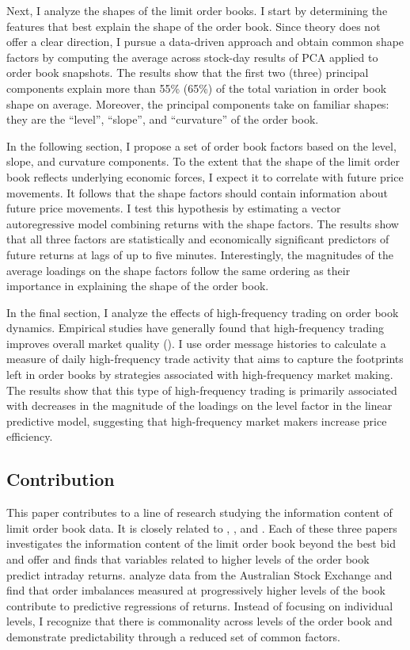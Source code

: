 Next, I analyze the shapes of the limit order books. I start by determining the features that best explain the shape of the order book. Since theory does not offer a clear direction, I pursue a data-driven approach and obtain common shape factors by computing the average across stock-day results of PCA applied to order book snapshots. The results show that the first two (three) principal components explain more than 55\% (65\%) of the total variation in order book shape on average. Moreover, the principal components take on familiar shapes: they are the ``level'', ``slope'', and ``curvature'' of the order book.

In the following section, I propose a set of order book factors based on the level, slope, and curvature components. To the extent that the shape of the limit order book reflects underlying economic forces, I expect it to correlate with future price movements. It follows that the shape factors should contain information about future price movements. I test this hypothesis by estimating a vector autoregressive model combining returns with the shape factors. The results show that all three factors are statistically and economically significant predictors of future returns at lags of up to five minutes. Interestingly, the magnitudes of the average loadings on the shape factors follow the same ordering as their importance in explaining the shape of the order book.

In the final section, I analyze the effects of high-frequency trading on order book dynamics. Empirical studies have generally found that high-frequency trading improves overall market quality (\citet{Boehmer2014,Hendershott2011,Hagstromer2013,Hasbrouck2013}). I use order message histories to calculate a measure of daily high-frequency trade activity that aims to capture the footprints left in order books by strategies associated with high-frequency market making. The results show that this type of high-frequency trading is primarily associated with decreases in the magnitude of the loadings on the level factor in the linear predictive model, suggesting that high-frequency market makers increase price efficiency.


\subsection{Contribution}
This paper contributes to a line of research studying the information content of limit order book data. It is closely related to \citet{Cao2009}, \citet{Yuferova2015}, and \citet{Beltran-Lopez2009}. Each of these three papers investigates the information content of the limit order book beyond the best bid and offer and finds that variables related to higher levels of the order book predict intraday returns. \citet{Cao2009} analyze data from the Australian Stock Exchange and find that order imbalances measured at progressively higher levels of the book contribute to predictive regressions of returns. Instead of focusing on individual levels, I recognize that there is commonality across levels of the order book and demonstrate predictability through a reduced set of common factors.

